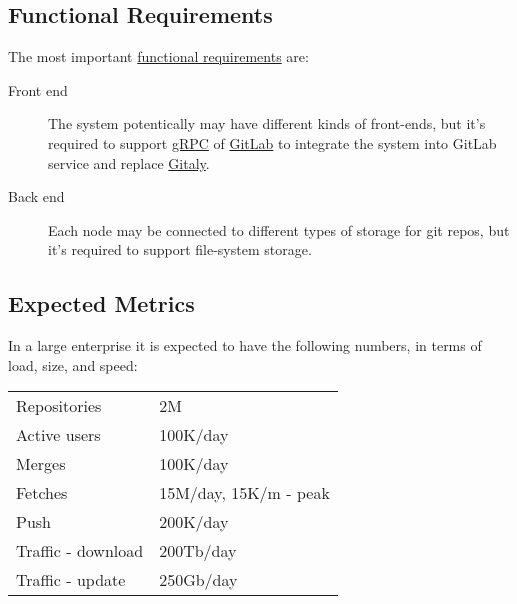 \documentclass[12pt,oneside]{article}
\begin{document}
\subsection{Functional Requirements}
\label{sec:nfr}

The most important \href{https://en.wikipedia.org/wiki/Functional_requirement}{functional requirements} are:

\begin{description}
  \item[Front end]
    The system potentically may have different kinds of front-ends,
    but it's required to support \href{https://grpc.io/}{gRPC}
    of \href{https://about.gitlab.com/}{GitLab} to integrate the system
    into GitLab service and replace
    \href{https://docs.gitlab.com/ee/administration/gitaly/}{Gitaly}.
  \item[Back end]
    Each node may be connected to different types of storage for git repos,
    but it's required to support file-system storage.
\end{description}

\subsection{Expected Metrics}
\label{ref:metrics}

In a large enterprise it is expected to have the following
numbers, in terms of load, size, and speed:

\begin{tabular}{ll}
  Repositories & 2M \\
  Active users & 100K/day \\
  Merges & 100K/day \\
  Fetches & 15M/day, 15K/m - peak \\
  Push & 200K/day \\
  Traffic - download & 200Tb/day \\
  Traffic - update & 250Gb/day \\
\end{tabular}

\printbibliography%
\end{document}
